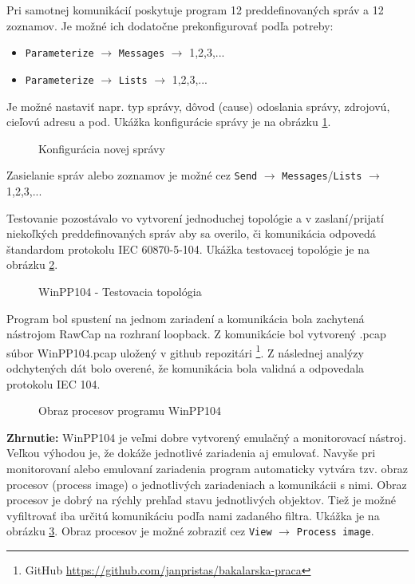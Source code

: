 Pri samotnej komunikácií poskytuje program 12 preddefinovaných správ a 12 zoznamov. Je možné ich dodatočne prekonfigurovať podľa potreby:
\begin{itemize}
\item {\tt Parameterize} $\rightarrow$ {\tt Messages} $\rightarrow$ 1,2,3,...
\item {\tt Parameterize} $\rightarrow$ {\tt Lists} $\rightarrow$ 1,2,3,...
\end{itemize}
Je možné nastaviť napr. typ správy, dôvod (cause) odoslania správy, zdrojovú, cieľovú adresu a pod. Ukážka konfigurácie správy je na obrázku \ref{WinPP104Mess}.
\begin{figure}[h]
    \centering
    \caption{Konfigurácia novej správy}
\label{WinPP104Mess}
\end{figure} \par
Zasielanie správ alebo zoznamov je možné cez {\tt Send} $\rightarrow$ {\tt Messages}/{\tt Lists} $\rightarrow$ 1,2,3,... \par
Testovanie pozostávalo vo vytvorení jednoduchej topológie a v zaslaní/prijatí niekoľkých preddefinovaných správ aby sa overilo, či komunikácia odpovedá štandardom protokolu IEC 60870-5-104. Ukážka testovacej topológie je na obrázku \ref{WinPP104-Topology}.
\begin{figure}[h]
    \centering
    \caption{WinPP104 - Testovacia topológia}
\label{WinPP104-Topology}
\end{figure}
Program bol spustení na jednom zariadení a komunikácia bola zachytená nástrojom RawCap na rozhraní loopback. Z komunikácie bol vytvorený .pcap súbor WinPP104.pcap uložený v github repozitári \footnote{GitHub \url{https://github.com/janpristas/bakalarska-praca}}. Z následnej analýzy odchytených dát bolo overené, že komunikácia bola validná a odpovedala protokolu IEC 104.
\begin{figure}[H]
    \centering
    \caption{Obraz procesov programu WinPP104}
\label{ProcessImage}
\end{figure} \par
\noindent \textbf{Zhrnutie:} WinPP104 je veľmi dobre vytvorený emulačný a monitorovací nástroj. Veľkou výhodou je, že dokáže jednotlivé zariadenia aj emulovať. 
Navyše pri monitorovaní alebo emulovaní zariadenia program automaticky vytvára tzv. obraz procesov (process image) o jednotlivých zariadeniach a komunikácii s nimi. Obraz procesov je dobrý na rýchly prehľad stavu jednotlivých objektov. Tiež je možné vyfiltrovať iba určitú komunikáciu podľa nami zadaného filtra. Ukážka je na obrázku \ref{ProcessImage}. Obraz procesov je možné zobraziť cez {\tt View} $\rightarrow$ {\tt Process image}. \par
